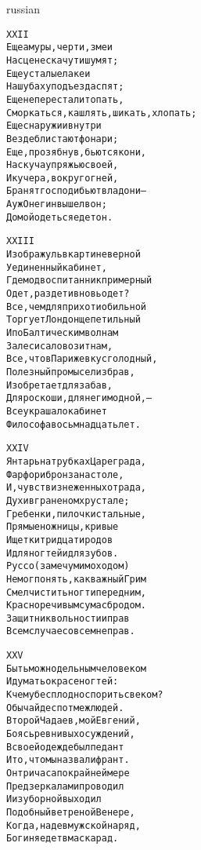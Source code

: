 \documentclass[12pt,twocolumn]{article}
\begin{document}
\begin{center}
\begin{otherlanguage*}{russian}
\begin{minipage}[t]{\dimexpr 0.5\textwidth -\tabcolsep-.5pt}
\begin{alltt}\normalfont\centering
XXII
Еще амуры, черти, змеи
На сцене скачут и шумят;
Еще усталые лакеи
На шубах у подъезда спят;
Еще не перестали топать,
Сморкаться, кашлять, шикать, хлопать;
Еще снаружи и внутри
Везде блистают фонари;
Еще, прозябнув, бьются кони,
Наскуча упряжью своей,
И кучера, вокруг огней,
Бранят господ и бьют в ладони —
А уж Онегин вышел вон;
Домой одеться едет он.
\end{alltt}
\end{minipage}
\clearpage

\begin{minipage}[t]{\dimexpr 0.5\textwidth -\tabcolsep-.5pt}
\begin{alltt}\normalfont\centering
XXIII
Изображу ль в картине верной
Уединенный кабинет,
Где мод воспитанник примерный
Одет, раздет и вновь одет?
Все, чем для прихоти обильной
Торгует Лондон щепетильный
И по Балтическим волнам
За лес и сало возит нам,
Все, что в Париже вкус голодный,
Полезный промысел избрав,
Изобретает для забав,
Для роскоши, для неги модной, —
Все украшало кабинет
Философа в осьмнадцать лет.
\end{alltt}
\end{minipage}

\begin{minipage}[t]{\dimexpr 0.5\textwidth -\tabcolsep-.5pt}
\begin{alltt}\normalfont\centering
XXIV
Янтарь на трубках Цареграда,
Фарфор и бронза на столе,
И, чувств изнеженных отрада,
Духи в граненом хрустале;
Гребенки, пилочки стальные,
Прямые ножницы, кривые
И щетки тридцати родов
И для ногтей и для зубов.
Руссо (замечу мимоходом)
Не мог понять, как важный Грим
Смел чистить ногти перед ним,
Красноречивым сумасбродом.
Защитник вольности и прав
В сем случае совсем неправ.
\end{alltt}
\end{minipage}
\clearpage

\begin{minipage}[t]{\dimexpr 0.5\textwidth -\tabcolsep-.5pt}
\begin{alltt}\normalfont\centering
XXV
Быть можно дельным человеком
И думать о красе ногтей:
К чему бесплодно спорить с веком?
Обычай деспот меж людей.
Второй Чадаев, мой Евгений,
Боясь ревнивых осуждений,
В своей одежде был педант
И то, что мы назвали франт.
Он три часа по крайней мере
Пред зеркалами проводил
И из уборной выходил
Подобный ветреной Венере,
Когда, надев мужской наряд,
Богиня едет в маскарад.
\end{alltt}
\end{minipage}


\end{otherlanguage*}
\end{center}
\end{document}
